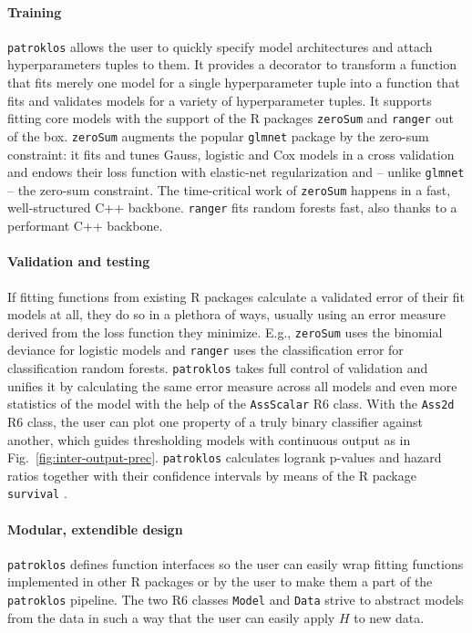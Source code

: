 \paragraph{Training} 
\texttt{patroklos} allows the user to quickly specify model architectures and 
attach hyperparameters tuples to them. It 
provides a decorator to transform a function that fits merely one model for a single hyperparameter 
tuple into a function that fits and validates models for a variety of hyperparameter tuples. 
It supports fitting core models with the support of the R packages \texttt{zeroSum} 
\cite{zerosumR} and \texttt{ranger} \cite{ranger17} out of the box. \texttt{zeroSum} 
augments the popular \texttt{glmnet} package by the zero-sum constraint: it fits and 
tunes Gauss, logistic and Cox models in a cross validation and endows their loss function 
with elastic-net regularization and -- unlike \texttt{glmnet} -- the zero-sum 
constraint. The time-critical work of \texttt{zeroSum} happens in a fast, well-structured C++ 
backbone. \texttt{ranger} fits random forests fast, also thanks to a performant C++ backbone. 

\paragraph{Validation and testing} 
If fitting functions from existing R packages calculate a validated error of 
their fit models at all, they do so in a plethora of ways, usually using an error measure derived 
from the loss function they minimize. E.g., \texttt{zeroSum} uses the binomial deviance for 
logistic models and \texttt{ranger} uses the classification error for classification random 
forests. \texttt{patroklos} takes 
full control of validation and unifies it
by calculating the same error measure across all models and even more statistics of the model
with the help of the \texttt{AssScalar} R6 class. With the \texttt{Ass2d} R6 class, the 
user can plot one property of a truly binary classifier against another, which guides 
thresholding models with continuous output as in Fig.\ \ref{fig:inter-output-prec}. 
\texttt{patroklos} calculates logrank p-values and hazard ratios together with their confidence
intervals by means of the R package \texttt{survival} \cite{survival-cran}.

\paragraph{Modular, extendible design} 
\texttt{patroklos} defines function interfaces so the user 
can easily wrap fitting functions implemented in other R packages or by the user to make 
them a part of the \texttt{patroklos} pipeline. The two R6 classes \texttt{Model} and \texttt{Data}
strive to abstract models from the data in such a way that the user can easily apply $H$ to new 
data.

